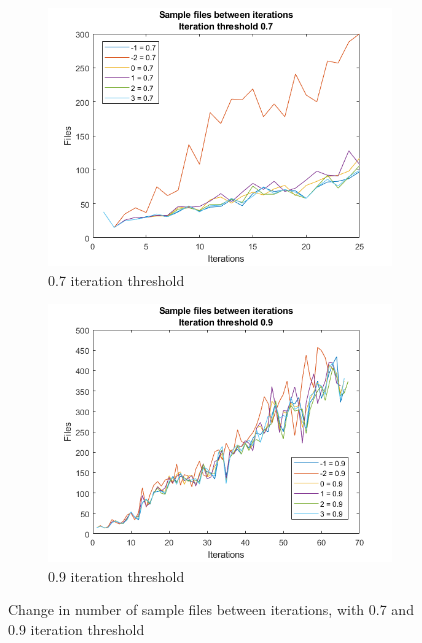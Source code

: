 \begin{figure}
    \centering
    \begin{subfigure}[b]{.45\textwidth}
        \centering
        \includegraphics[width=\textwidth]{figures/iterfiles-0.7.png}
        \caption{0.7 iteration threshold}
        \label{sfig:iter:iterfiles0.7}
    \end{subfigure}
    \hfill
    \begin{subfigure}[b]{.45\textwidth}
        \centering
        \includegraphics[width=\textwidth]{figures/iterfiles-0.9.png}
        \caption{0.9 iteration threshold}
        \label{sfig:iter:iterfiles0.9}
    \end{subfigure}
    \caption{Change in number of sample files between iterations, with 0.7 and 0.9 iteration threshold}
    \label{fig:iter:iterfiles0.70.9}
\end{figure}

